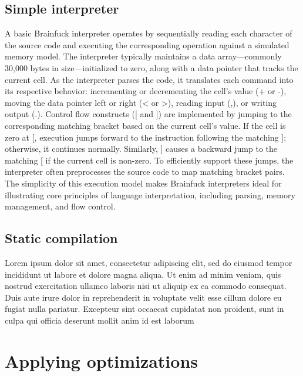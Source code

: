 \par 

\subsection{Simple interpreter}
\label{sec:ch2sec2sub2}

\par A basic Brainfuck interpreter operates by sequentially reading each character of the source code and executing the corresponding operation against a simulated memory model. The interpreter typically maintains a data array—commonly 30,000 bytes in size—initialized to zero, along with a data pointer that tracks the current cell. As the interpreter parses the code, it translates each command into its respective behavior: incrementing or decrementing the cell's value (+ or -), moving the data pointer left or right (< or >), reading input (,), or writing output (.). Control flow constructs ([ and ]) are implemented by jumping to the corresponding matching bracket based on the current cell's value. If the cell is zero at [, execution jumps forward to the instruction following the matching ]; otherwise, it continues normally. Similarly, ] causes a backward jump to the matching [ if the current cell is non-zero. To efficiently support these jumps, the interpreter often preprocesses the source code to map matching bracket pairs. The simplicity of this execution model makes Brainfuck interpreters ideal for illustrating core principles of language interpretation, including parsing, memory management, and flow control.

\subsection{Static compilation}
\label{sec:ch2sec2sub3}

\par Lorem ipsum dolor sit amet, consectetur adipiscing elit, sed do eiusmod tempor incididunt ut labore et dolore magna aliqua. Ut enim ad minim veniam, quis nostrud exercitation ullamco laboris nisi ut aliquip ex ea commodo consequat. Duis aute irure dolor in reprehenderit in voluptate velit esse cillum dolore eu fugiat nulla pariatur. Excepteur sint occaecat cupidatat non proident, sunt in culpa qui officia deserunt mollit anim id est laborum

\section{Applying optimizations}
\label{sec:ch2sec3}

